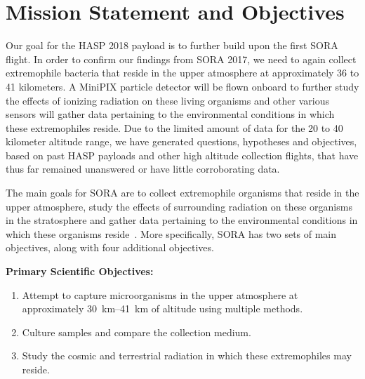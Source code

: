\section{Mission Statement and Objectives}
\label{sec:Introduction}

Our goal for the HASP 2018 payload is to further build upon the first SORA~\cite{SORA} flight.  In order to confirm our findings from SORA 2017, we need to again collect extremophile bacteria that reside in the upper atmosphere at approximately 36 to 41 kilometers.  A MiniPIX particle detector will be flown onboard to further study the effects of ionizing radiation on these living organisms and other various sensors will gather data pertaining to the environmental conditions in which these extremophiles reside. Due to the limited amount of data for the 20 to 40 kilometer altitude range, we have generated questions, hypotheses and objectives, based on past HASP payloads and other high altitude collection flights, that have thus far remained unanswered or have little corroborating data.


The main goals for SORA are to collect extremophile organisms that reside in the upper atmosphere, study the effects of surrounding radiation on these organisms in the stratosphere and gather data pertaining to the environmental conditions in which these organisms reside~\cite{SORA}.  More specifically, SORA has two sets of main objectives, along with four additional objectives.

{\bf Primary Scientific Objectives:}
	\begin{enumerate}
	\item Attempt to capture microorganisms in the upper atmosphere at approximately \SIrange{30}{41}{\kilo\meter} of altitude using multiple methods. 
	\item Culture samples and compare the collection medium.
	\item Study the cosmic and terrestrial radiation in which these extremophiles may reside.
	\end{enumerate}
	
